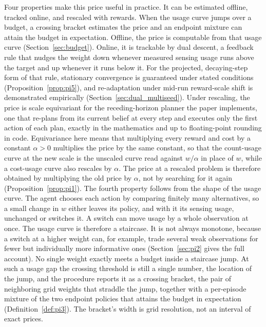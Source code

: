 Four properties make this price useful in practice. It can be estimated offline, tracked online, and rescaled with rewards. When the usage curve jumps over a budget, a crossing bracket estimates the price and an endpoint mixture can attain the budget in expectation. Offline, the price is computable from that usage curve (Section~\ref{sec:budget}). Online, it is trackable by dual descent, a feedback rule that nudges the weight down whenever measured sensing usage runs above the target and up whenever it runs below it. For the projected, decaying-step form of that rule, stationary convergence is guaranteed under stated conditions (Proposition~\ref{prop:pi5}), and re-adaptation under mid-run reward-scale shift is demonstrated empirically (Section~\ref{sec:dual_multiseed}). Under rescaling, the price is scale equivariant for the receding-horizon planner the paper implements, one that re-plans from its current belief at every step and executes only the first action of each plan, exactly in the mathematics and up to floating-point rounding in code. Equivariance here means that multiplying every reward and cost by a constant $\alpha>0$ multiplies the price by the same constant, so that the count-usage curve at the new scale is the unscaled curve read against $w/\alpha$ in place of $w$, while a cost-usage curve also rescales by $\alpha$. The price at a rescaled problem is therefore obtained by multiplying the old price by $\alpha$, not by searching for it again (Proposition~\ref{prop:pi1}). The fourth property follows from the shape of the usage curve. The agent chooses each action by comparing finitely many alternatives, so a small change in $w$ either leaves its policy, and with it its sensing usage, unchanged or switches it. A switch can move usage by a whole observation at once. The usage curve is therefore a staircase. It is not always monotone, because a switch at a higher weight can, for example, trade several weak observations for fewer but individually more informative ones (Section~\ref{sec:pi2} gives the full account). No single weight exactly meets a budget inside a staircase jump. At such a usage gap the crossing threshold is still a single number, the location of the jump, and the procedure reports it as a crossing bracket, the pair of neighboring grid weights that straddle the jump, together with a per-episode mixture of the two endpoint policies that attains the budget in expectation (Definition~\ref{def:pi3}). The bracket's width is grid resolution, not an interval of exact prices.

